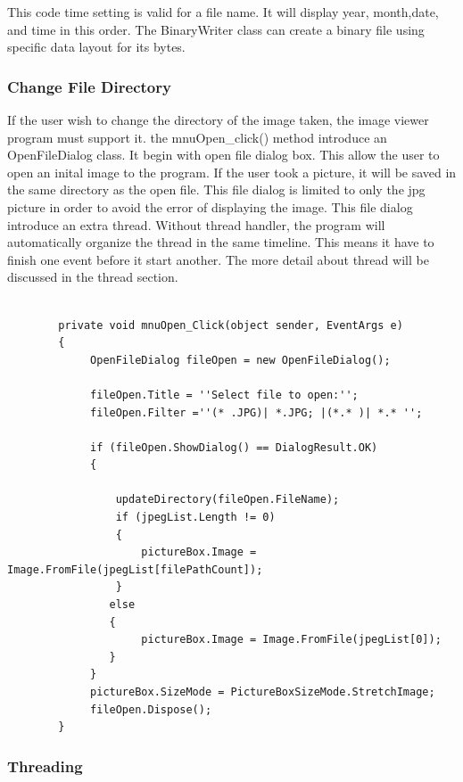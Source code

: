             This code time setting is valid for a file name. It will display year, month,date, and time in this order. The BinaryWriter class can create a binary file using specific data layout for its bytes. 

\subsubsection*{Change File Directory}
If the user wish to change the directory of the image taken, the image viewer program must support it. the mnuOpen\_click() method introduce an OpenFileDialog class. It begin with open file dialog box. This allow the user to open an inital image to the program. If the user took a picture, it will be saved in the same directory as the open file. This file dialog is limited to only the jpg picture in order to avoid the error of displaying the image. 
This file dialog introduce an extra thread. Without thread handler, the program will automatically organize the thread in the same timeline. This means it have to finish one event before it start another. The more detail about thread will be discussed in the thread section. 
\begin{lstlisting}[caption={change file directory},label=lst:changeFD]

        private void mnuOpen_Click(object sender, EventArgs e)        
        {        
             OpenFileDialog fileOpen = new OpenFileDialog();      
            
             fileOpen.Title = ''Select file to open:'';   
             fileOpen.Filter =''(* .JPG)| *.JPG; |(*.* )| *.* '';           

             if (fileOpen.ShowDialog() == DialogResult.OK)    
             {
    
                 updateDirectory(fileOpen.FileName);     
                 if (jpegList.Length != 0)     
                 {                    
                     pictureBox.Image = Image.FromFile(jpegList[filePathCount]);       
                 }         
                else       
                {       
                     pictureBox.Image = Image.FromFile(jpegList[0]);        
                }        
             }        
             pictureBox.SizeMode = PictureBoxSizeMode.StretchImage;       
             fileOpen.Dispose();        
        }       
        \end{lstlisting}
\subsubsection*{Threading}


